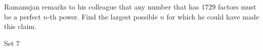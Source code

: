 Ramanujan remarks to his colleague that any number that has $1729$ factors must be a perfect $n$-th power. Find the largest possible $n$ for which he could have made this claim.





Set 7
